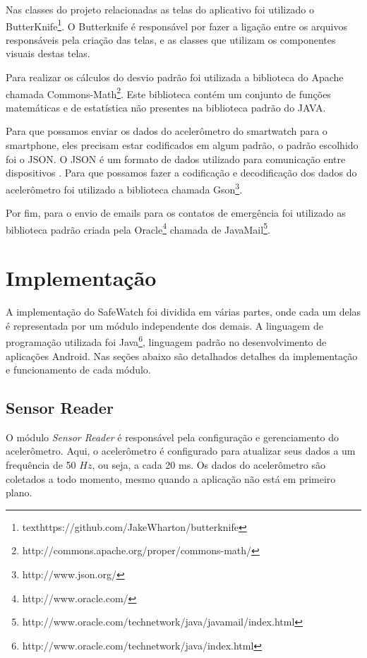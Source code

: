 Nas classes do projeto relacionadas as telas do aplicativo foi utilizado o ButterKnife\footnote{texthttps://github.com/JakeWharton/butterknife}. O Butterknife é responsável por fazer a ligação entre os arquivos responsáveis pela criação das telas, e as classes que utilizam os componentes visuais destas telas. 

Para realizar os cálculos do desvio padrão foi utilizada a biblioteca do Apache chamada Commons-Math\footnote{http://commons.apache.org/proper/commons-math/}. Este biblioteca contém um conjunto de funções matemáticas e de estatística não presentes na biblioteca padrão do JAVA. 

Para que possamos enviar os dados do acelerômetro do smartwatch para o smartphone, eles precisam estar codificados em algum padrão, o padrão escolhido foi o JSON. O JSON é um formato de dados utilizado para comunicação entre dispositivos \citep{JSON;16}. Para que possamos fazer a codificação e decodificação dos dados do acelerômetro foi utilizado a biblioteca chamada Gson\footnote{http://www.json.org/}.

Por fim, para o envio de emails para os contatos de emergência foi utilizado as biblioteca padrão criada pela Oracle\footnote{http://www.oracle.com/} chamada de JavaMail\footnote{http://www.oracle.com/technetwork/java/javamail/index.html}. 





\section{Implementação}
\label{sec:implementation}
A implementação do SafeWatch foi dividida em várias partes, onde cada um delas é representada por um módulo independente dos demais. A linguagem de programação utilizada foi Java\footnote{http://www.oracle.com/technetwork/java/index.html}, linguagem padrão no desenvolvimento de aplicações Android. Nas seções abaixo são detalhados detalhes da implementação e funcionamento de cada módulo.


\subsection{Sensor Reader}
O módulo \textit{Sensor Reader} é responsável pela configuração e gerenciamento do acelerômetro. Aqui, o acelerômetro é configurado para atualizar seus dados a um frequência de 50 $Hz$, ou seja, a cada 20 ms. Os dados do acelerômetro são coletados a todo momento, mesmo quando a aplicação não está em primeiro plano.

